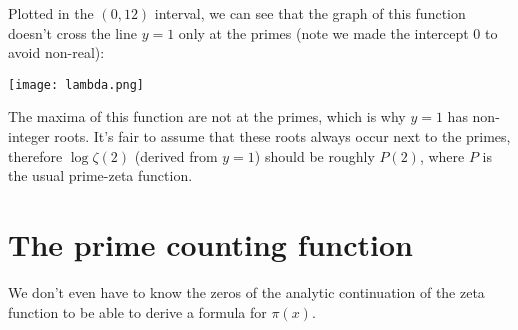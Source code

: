 \documentclass[12pt]{article}
\begin{document}
Plotted in the $(0,12)$ interval, we can see that the graph of this function doesn't cross the line $y=1$ only at the primes (note we made the intercept 0 to avoid non-real):
\begin{center}
\texttt{[image: lambda.png]}
\end{center}

\indent The maxima of this function are not at the primes, which is why $y=1$ has non-integer roots. It's fair to assume that these roots always occur next to the primes, therefore $\log{\zeta(2)}$ (derived from $y=1$) should be roughly $P(2)$, where $P$ is the usual prime-zeta function.

\newpage

\section{The prime counting function}
We don't even have to know the zeros of the analytic continuation of the zeta function to be able to derive a formula for $\pi(x)$.\\
\end{document}
